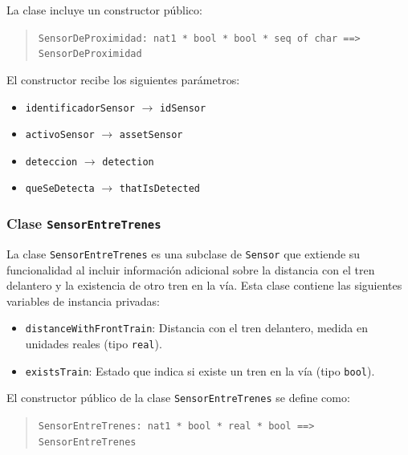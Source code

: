 \documentclass[journal]{IEEEtran}
\begin{document}
    La clase incluye un constructor público:

    \begin{quote}
    \texttt{SensorDeProximidad: nat1 * bool * bool * seq of char \texttt{==>} SensorDeProximidad}
    \end{quote}

    El constructor recibe los siguientes parámetros:
    \begin{itemize}
    \item \texttt{identificadorSensor} $\rightarrow$ \texttt{idSensor}
    \item \texttt{activoSensor} $\rightarrow$ \texttt{assetSensor}
    \item \texttt{deteccion} $\rightarrow$ \texttt{detection}
    \item \texttt{queSeDetecta} $\rightarrow$ \texttt{thatIsDetected}
    \end{itemize}




    \subsubsection*{Clase \texttt{SensorEntreTrenes}}

    La clase \texttt{SensorEntreTrenes} es una subclase de \texttt{Sensor} que extiende su funcionalidad al incluir información adicional sobre la distancia con el tren delantero y la existencia de otro tren en la vía. Esta clase contiene las siguientes variables de instancia privadas:

    \begin{itemize}
    \item \texttt{distanceWithFrontTrain}: Distancia con el tren delantero, medida en unidades reales (tipo \texttt{real}).
    \item \texttt{existsTrain}: Estado que indica si existe un tren en la vía (tipo \texttt{bool}).
    \end{itemize}

    El constructor público de la clase \texttt{SensorEntreTrenes} se define como:

    \begin{quote}
    \texttt{SensorEntreTrenes: nat1 * bool * real * bool \texttt{==>} SensorEntreTrenes}
    \end{quote}
\end{document}
